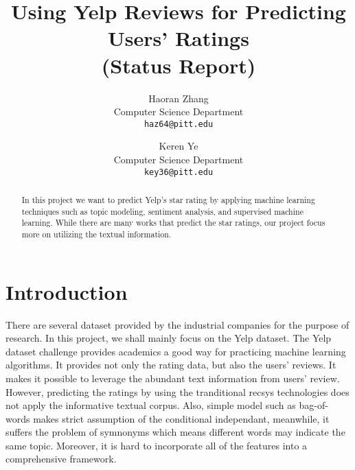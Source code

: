 \documentclass[10pt,twocolumn,letterpaper]{article}
\begin{document}
\title{Using Yelp Reviews for Predicting Users' Ratings \\(Status Report)}

\author{Haoran Zhang\\
Computer Science Department\\
{\tt\small haz64@pitt.edu}
\and
Keren Ye\\
Computer Science Department\\
{\tt\small key36@pitt.edu}
}

\maketitle

\begin{abstract}
In this project we want to predict Yelp’s star rating by applying machine learning techniques such as topic modeling, sentiment analysis, and supervised machine learning. While there are many works that predict the star ratings, our project focus more on utilizing the textual information.

\end{abstract}

\section{Introduction}

There are several dataset provided by the industrial companies for the purpose of research. In this project, we shall mainly focus on the Yelp dataset. The Yelp dataset challenge provides academics a good way for practicing machine learning algorithms. It provides not only the rating data, but also the users’ reviews. It makes it possible to leverage the abundant text information from users’ review. However, predicting the ratings by using the tranditional recsys technologies does not apply the informative textual corpus. Also, simple model such as bag-of-words makes strict assumption of the conditional independant, meanwhile, it suffers the problem of symnonyms which means different words may indicate the same topic. Moreover, it is hard to incorporate all of the features into a comprehensive framework.
\end{document}

